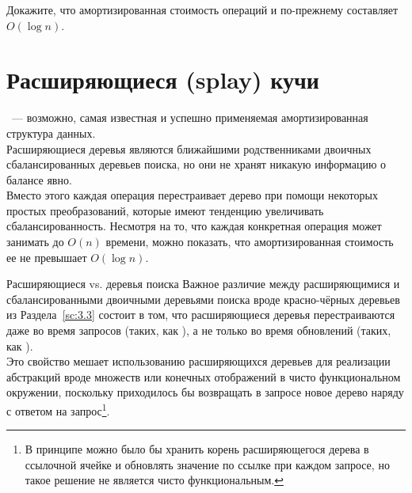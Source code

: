 \ifanswers
\begin{frame}[fragile]{}
\begin{exercise}\label{ex:5.3}
  Докажите, что амортизированная стоимость операций 
  и  по-прежнему составляет $O(\log n)$.
\end{exercise}
\end{frame}
\fi


\section{Расширяющиеся (splay) кучи}
\label{sc:5.4}

\begin{frame}{}
 \cite{SleatorTarjan1985}~--- возможно, самая известная
и успешно применяемая амортизированная структура данных.\\

 Расширяющиеся
деревья являются ближайшими родственниками двоичных сбалансированных
деревьев поиска, но они не хранят никакую информацию о балансе
явно. \\

Вместо этого каждая операция перестраивает дерево при помощи
некоторых простых преобразований, которые имеют тенденцию увеличивать
сбалансированность. Несмотря на то, что каждая конкретная операция
может занимать до $O(n)$ времени, можно показать, что 
амортизированная стоимость ее не превышает $O(\log n)$.
\end{frame}


\begin{frame}[fragile]{Расширяющиеся vs. деревья поиска}
Важное различие между расширяющимися и сбалансированными
двоичными деревьями поиска вроде красно-чёрных деревьев из
Раздела~\ref{sc:3.3} состоит в том, что расширяющиеся деревья
перестраиваются даже во время запросов (таких, как ),
а не только во время обновлений (таких, как ). \\

Это
свойство мешает использованию расширяющихся деревьев для реализации
абстракций вроде множеств или конечных отображений в чисто
функциональном окружении, поскольку приходилось бы возвращать в
запросе новое дерево наряду с ответом на запрос\footnote{%
  В принципе можно было бы хранить корень расширяющегося дерева в
  ссылочной ячейке и обновлять значение по ссылке при каждом запросе, но
  такое решение не является чисто функциональным.
}.
\end{frame}


